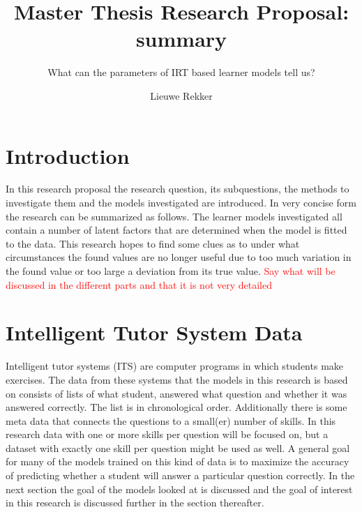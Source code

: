 \documentclass{scrartcl}
\newcommand\todo[1]{\textcolor{red}{#1}}
\begin{document}
\title{Master Thesis Research Proposal: summary}
\subtitle{What can the parameters of IRT based learner models tell us?}
\author{Lieuwe Rekker}
\maketitle


\section{Introduction}
In this research proposal the research question, its subquestions, the methods to investigate them and the models investigated are introduced. In very concise form the research can be summarized as follows. The learner models investigated all contain a number of latent factors that are determined when the model is fitted to the data. This research hopes to find some clues as to under what circumstances the found values are no longer useful due to too much variation in the found value or too large a deviation from its true value.
\todo{Say what will be discussed in the different parts and that it is not very detailed}

\section{Intelligent Tutor System Data}
 Intelligent tutor systems (ITS) are computer programs in which students make exercises. The data from these systems that the models in this research is based on consists of lists of what student, answered what question and whether it was answered correctly. The list is in chronological order. Additionally there is some meta data that connects the questions to a small(er) number of skills. In this research data with one or more skills per question will be focused on, but a dataset with exactly one skill per question might be used as well. A general goal for many of the models trained on this kind of data is to maximize the accuracy of predicting whether a student will answer a particular question correctly. In the next section the goal of the models looked at is discussed and the goal of interest in this research is discussed further in the section thereafter.
\end{document}
